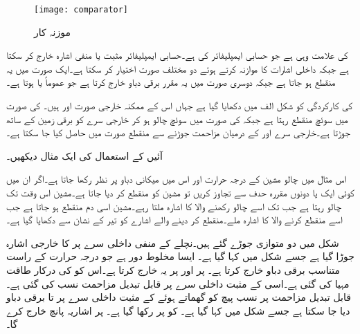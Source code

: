 \begin{figure}
\centering
\texttt{[image: comparator]}
\caption{موزنہ کار}
\label{شکل_حسابی_موازنہ_کار}
\end{figure}

 کی علامت وہی ہے جو حسابی ایمپلیفائر کی ہے۔حسابی ایمپلیفائر مثبت یا منفی اشارہ خارج کر سکتا ہے جبکہ   داخلی اشارات کا موازنہ کرتے ہوئے  دو مختلف صورت اختیار کر سکتا ہے۔ایک صورت میں یہ منقطع ہو جاتا ہے جبکہ دوسری صورت میں یہ مقرر برقی دباو خارج کرتا ہے جو عموماً   یا  ہوتا ہے۔

  کی کارکردگی کو شکل  الف     میں دکھایا گیا ہے جہاں اس کے ممکنہ خارجی صورت  اور  ہیں۔ کی صورت میں سوئچ منقطع رہتا ہے جبکہ  کی صورت میں سوئچ چالو ہو کر خارجی سرے  کو برقی زمین کے ساتھ جوڑتا ہے۔خارجی سرے اور  کے درمیان مزاحمت  جوڑنے سے منقطع صورت میں  حاصل کیا جا سکتا ہے۔

آئیں  کے استعمال کی ایک مثال دیکھیں۔

 اس مثال میں چالو مشین کے درجہ حرارت اور اس میں میکانی دباو پر نظر رکھا جاتا ہے۔اگر ان میں کوئی ایک یا دونوں مقررہ حدف سے تجاوز کریں تو مشین کو منقطع کر دیا جاتا ہے۔مشین اس وقت تک چالو رہتا ہے جب تک اسے چالو رکھنے والا  کا اشارہ ملتا رہے۔مشین اسی دم منقطع ہو جاتا ہے جب اسے منقطع کرنے والا  کا اشارہ ملے۔منقطع کر دینے والے اشارے کو تیر کے نشان سے دکھایا گیا ہے۔

شکل  میں  دو  متوازی جوڑے گئے ہیں۔نچلے  کے منفی داخلی سرے  پر  کا خارجی اشارہ جوڑا گیا ہے جسے شکل میں  کہا گیا ہے۔ ایسا مخلوط دور ہے جو درجہ حرارت کے راست متناسب برقی دباو خارج کرتا ہے۔ پر  اور  پر  یہ  خارج کرتا ہے۔اس کو  کی درکار طاقت مہیا کی گئی ہے۔اسی  کے مثبت داخلی سرے  پر قابل تبدیل مزاحمت نسب کی گئی ہے۔قابل تبدیل مزاحمت پر نسب پیچ کو گھماتے ہوئے  کے مثبت داخلی سرے  پر  تا  برقی دباو دیا  جا سکتا ہے جسے  شکل میں  کہا گیا ہے۔ کو  پر رکھا گیا ہے۔ پر  اشاریہ پانچ  خارج کرے گا۔

